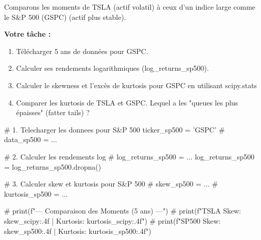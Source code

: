 \begin{exercicebox}
Comparons les moments de TSLA (actif volatil) à ceux d'un indice large comme le S\&P 500 (GSPC) (actif plus stable).

\textbf{Votre tâche :}
\begin{enumerate}
    \item Télécharger 5 ans de données pour GSPC.
    \item Calculer ses rendements logarithmiques (log\_returns\_sp500).
    \item Calculer le skewness et l'excès de kurtosis pour GSPC en utilisant scipy.stats
    \item Comparer les kurtosis de TSLA et GSPC. Lequel a les "queues les plus épaisses" (fatter tails) ?
\end{enumerate}

\begin{codecell}
# 1. Telecharger les donnees pour S&P 500
ticker_sp500 = 'GSPC'
# data_sp500 = ...

# 2. Calculer les rendements log
# log_returns_sp500 = ...
log_returns_sp500 = log_returns_sp500.dropna()

# 3. Calculer skew et kurtosis pour S&P 500
# skew_sp500 = ...
# kurtosis_sp500 = ...

# print(f"--- Comparaison des Moments (5 ans) ---")
# print(f"TSLA Skew: {skew_scipy:.4f} | Kurtosis: {kurtosis_scipy:.4f}")
# print(f"SP500 Skew: {skew_sp500:.4f} | Kurtosis: {kurtosis_sp500:.4f}")
\end{codecell}
\end{exercicebox}
